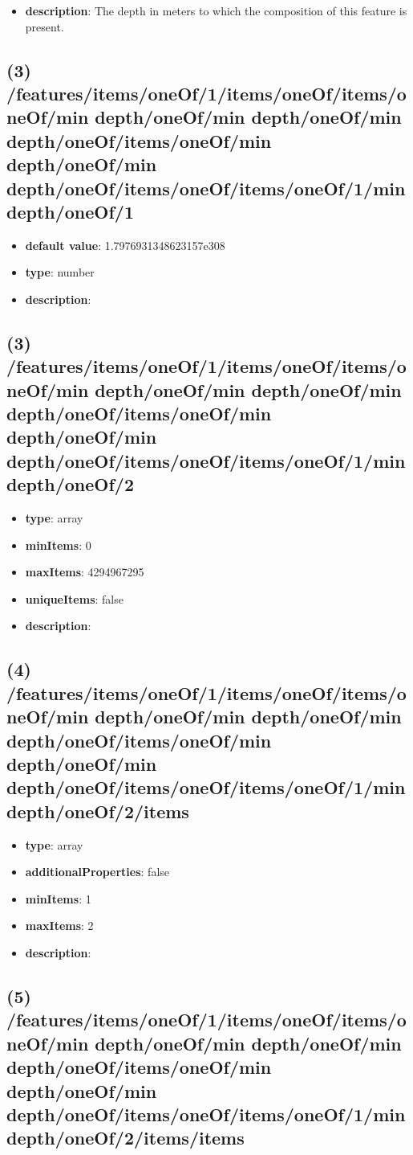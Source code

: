 \begin{itemize}[leftmargin=2em]\item {\bf description}: The depth in meters to which the composition of this feature is present.
\end{itemize}
\subsection{(3) /features/items/oneOf/1/items/oneOf/items/oneOf/min depth/oneOf/min depth/oneOf/min depth/oneOf/items/oneOf/min depth/oneOf/min depth/oneOf/items/oneOf/items/oneOf/1/min depth/oneOf/1}
\begin{itemize}[leftmargin=3em]\item {\bf default value}: 1.7976931348623157e308
\item {\bf type}: number
\item {\bf description}: 
\end{itemize}\subsection{(3) /features/items/oneOf/1/items/oneOf/items/oneOf/min depth/oneOf/min depth/oneOf/min depth/oneOf/items/oneOf/min depth/oneOf/min depth/oneOf/items/oneOf/items/oneOf/1/min depth/oneOf/2}
\begin{itemize}[leftmargin=3em]\item {\bf type}: array
\item {\bf minItems}: 0
\item {\bf maxItems}: 4294967295
\item {\bf uniqueItems}: false
\item {\bf description}: 
\end{itemize}\subsection{(4) /features/items/oneOf/1/items/oneOf/items/oneOf/min depth/oneOf/min depth/oneOf/min depth/oneOf/items/oneOf/min depth/oneOf/min depth/oneOf/items/oneOf/items/oneOf/1/min depth/oneOf/2/items}
\begin{itemize}[leftmargin=4em]\item {\bf type}: array
\item {\bf additionalProperties}: false
\item {\bf minItems}: 1
\item {\bf maxItems}: 2
\item {\bf description}: 
\end{itemize}\subsection{(5) /features/items/oneOf/1/items/oneOf/items/oneOf/min depth/oneOf/min depth/oneOf/min depth/oneOf/items/oneOf/min depth/oneOf/min depth/oneOf/items/oneOf/items/oneOf/1/min depth/oneOf/2/items/items}
